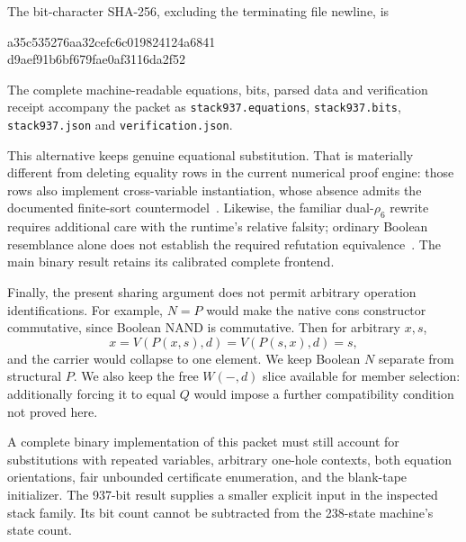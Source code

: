 The bit-character SHA-256, excluding the terminating file newline, is
\begin{center}\small\ttfamily
a35c535276aa32cefc6c019824124a6841\\
d9aef91b6bf679fae0af3116da2f52
\end{center}
The complete machine-readable equations, bits, parsed data and
verification receipt accompany the packet as
\texttt{stack937.equations}, \texttt{stack937.bits},
\texttt{stack937.json} and \texttt{verification.json}.

This alternative keeps genuine equational substitution.  That is
materially different from deleting equality rows in the current
numerical proof engine: those rows also implement cross-variable
instantiation, whose absence admits the documented finite-sort
countermodel~\cite{typedcountermodel}.  Likewise, the familiar
dual-\(\rho_6\) rewrite requires additional care with the runtime's
relative falsity; ordinary Boolean resemblance alone does not
establish the required refutation equivalence~\cite{dualgap}.
The main binary result retains its calibrated complete frontend.

Finally, the present sharing argument does not permit arbitrary
operation identifications.  For example, \(N=P\) would make
the native cons constructor commutative, since Boolean NAND is
commutative.  Then for arbitrary \(x,s\),
\[
 x=V(P(x,s),d)=V(P(s,x),d)=s,
\]
and the carrier would collapse to one element.  We keep Boolean
\(N\) separate from structural \(P\).  We also keep the free
\(W(-,d)\) slice available for member selection: additionally
forcing it to equal \(Q\) would impose a further compatibility
condition not proved here.

A complete binary implementation of this packet must still account
for substitutions with repeated variables, arbitrary one-hole
contexts, both equation orientations, fair unbounded certificate
enumeration, and the blank-tape initializer.  The 937-bit result
supplies a smaller explicit input in the inspected stack family.
Its bit count cannot be subtracted from the 238-state machine's
state count.
